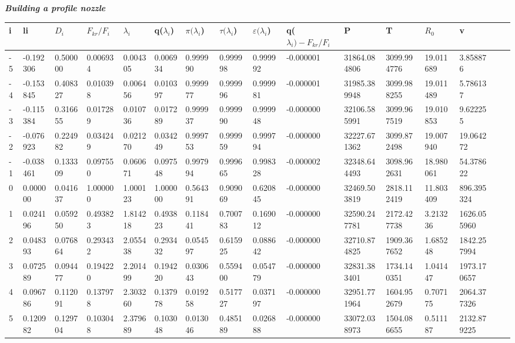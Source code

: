 \begin{center}
\begin{large}
\textbf{\textit {Building a profile nozzle}}\\
\end{large}
\begin{tabular}{|l*{15}{l|}}
\hline
i & li & \(D_i\) & \(F_{kr}/F_i\) & $\lambda_i$ & q($\lambda_i$) & $\pi(\lambda_i$) & $\tau(\lambda_i$) & $\varepsilon(\lambda_i$) & q($\lambda_i) - F_{kr}/F_i$ & P & T & \(R_0\) & v  \\
\hline
-5 & -0.192306 & 0.500000 & 0.006934 & 0.004305 & 0.006934 & 0.999990 & 0.999998 & 0.999992 & -0.000001 & 31864.084806 & 3099.994776 & 19.011689 & 3.858876 \\
-4 & -0.153845 & 0.408327 & 0.010398 & 0.006456 & 0.010397 & 0.999977 & 0.999996 & 0.999981 & -0.000001 & 31985.389948 & 3099.988255 & 19.011489 & 5.786137 \\
-3 & -0.115384 & 0.316655 & 0.017289 & 0.010736 & 0.017289 & 0.999937 & 0.999990 & 0.999948 & -0.000000 & 32106.585991 & 3099.967519 & 19.010853 & 9.622255 \\
-2 & -0.076923 & 0.224982 & 0.034249 & 0.021270 & 0.034249 & 0.999753 & 0.999959 & 0.999794 & -0.000000 & 32227.671362 & 3099.872498 & 19.007940 & 19.064272 \\
-1 & -0.038461 & 0.133309 & 0.097550 & 0.060671 & 0.097548 & 0.997994 & 0.999665 & 0.998328 & -0.000002 & 32348.644493 & 3098.962631 & 18.980061 & 54.378622 \\
0 & 0.000000 & 0.041637 & 1.000000 & 1.000123 & 1.000000 & 0.564391 & 0.909069 & 0.620845 & -0.000000 & 32469.503819 & 2818.112419 & 11.803409 & 896.395324 \\
1 & 0.024196 & 0.059250 & 0.493823 & 1.814218 & 0.493823 & 0.118441 & 0.700783 & 0.169012 & -0.000000 & 32590.247781 & 2172.427738 & 3.213236 & 1626.055960 \\
2 & 0.048393 & 0.076864 & 0.293432 & 2.055438 & 0.293432 & 0.054597 & 0.615925 & 0.088642 & -0.000000 & 32710.874825 & 1909.367652 & 1.685248 & 1842.257994 \\
3 & 0.072589 & 0.094477 & 0.194220 & 2.201499 & 0.194220 & 0.030643 & 0.559400 & 0.054779 & -0.000000 & 32831.383401 & 1734.140351 & 1.041447 & 1973.170657 \\
4 & 0.096786 & 0.112091 & 0.137978 & 2.303260 & 0.137978 & 0.019258 & 0.517727 & 0.037197 & -0.000000 & 32951.771964 & 1604.952679 & 0.707175 & 2064.377326 \\
5 & 0.120982 & 0.129704 & 0.103048 & 2.379689 & 0.103048 & 0.013046 & 0.485189 & 0.026888 & -0.000000 & 33072.038973 & 1504.086655 & 0.511187 & 2132.879225 \\

\end{tabular}
\end{center}
